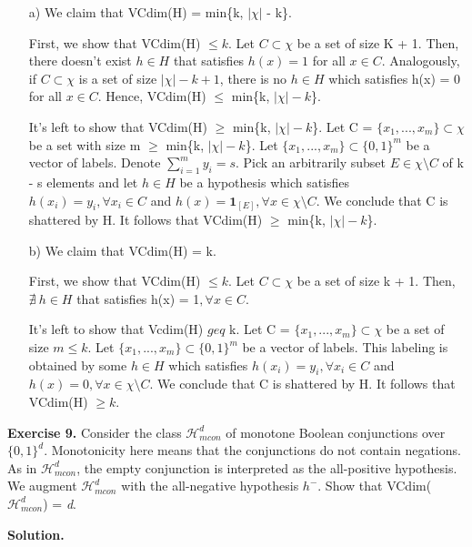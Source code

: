 \documentclass{article}
\newcommand{\<}{\langle}
\renewcommand{\>}{\rangle}
\theoremstyle{definition}
\begin{document}
\begin{itemize}
    \item[a)] We claim that VCdim(H) = min\{k, $|\chi|$ - k\}.
    
    First, we show that VCdim(H) $\leq k$. Let $C \subset \chi$ be a set of size K + 1. Then, there doesn't exist $h \in H$ that satisfies $h(x) = 1$ for all $x \in C$. Analogously, if $C \subset \chi$ is a set of size $|\chi| - k + 1$, there is no $h \in H$ which satisfies h(x) = 0 for all $x \in C$. Hence, VCdim(H) $\leq$ min\{k, $|\chi| - k$\}.
    
    It's left to show that VCdim(H) $\geq$ min\{k, $|\chi| - k$\}. Let C = $\{x_1, ...,x_m\} \subset \chi$ be a set with size m $\geq$ min\{k, $|\chi| - k$\}. Let $\{x_1, ...,x_m\} \subset \{0,1\}^m$ be a vector of labels. Denote $\sum_{i=1}^{m} y_i = s$. Pick an arbitrarily subset $E \in \chi \setminus C$ of k - s elements and let $h \in H$ be a hypothesis which satisfies $h(x_i) = y_i, \forall x_i \in C$ and $h(x) = \textbf{1}_{[E]}, \forall x \in \chi \setminus C$. We conclude that C is shattered by H. It follows that VCdim(H) $\geq$ min\{k, $|\chi| - k$\}.
    
    \item[b)] We claim that VCdim(H) = k.
    
    First, we show that VCdim(H) $\leq k$. Let $C \subset \chi$ be a set of size k + 1. Then, $\nexists \ h \in H$ that satisfies h(x) = 1$, \forall x \in C$.
    
    It's left to show that Vcdim(H) $geq$ k. Let C = $\{x_1, ...,x_m\} \subset \chi$ be a set of size $m \leq k$. Let $\{x_1, ...,x_m\} \subset \{0,1\}^m$ be a vector of labels. This labeling is obtained by some $h \in H$ which satisfies $h(x_i) = y_i, \forall x_i \in C$ and $h(x) = 0, \forall x \in \chi \setminus C$. We conclude that C is shattered by H. It follows that VCdim(H) $\geq k$. 
\end{itemize}

\vspace{3mm}

\textbf{Exercise 9.} Consider the class $\mathcal{H}^{d}_{mcon}$ of monotone Boolean conjunctions over $\{0,1\}^{d}$. Monotonicity here means that the conjunctions do not contain negations. As in $\mathcal{H}^{d}_{mcon}$, the empty conjunction is interpreted as the all-positive hypothesis. We augment $\mathcal{H}^{d}_{mcon}$ with the all-negative hypothesis $h^{-}$. Show that VCdim($\mathcal{H}^{d}_{mcon}$) = \textit{d}.

\textbf{Solution.}
\end{document}
